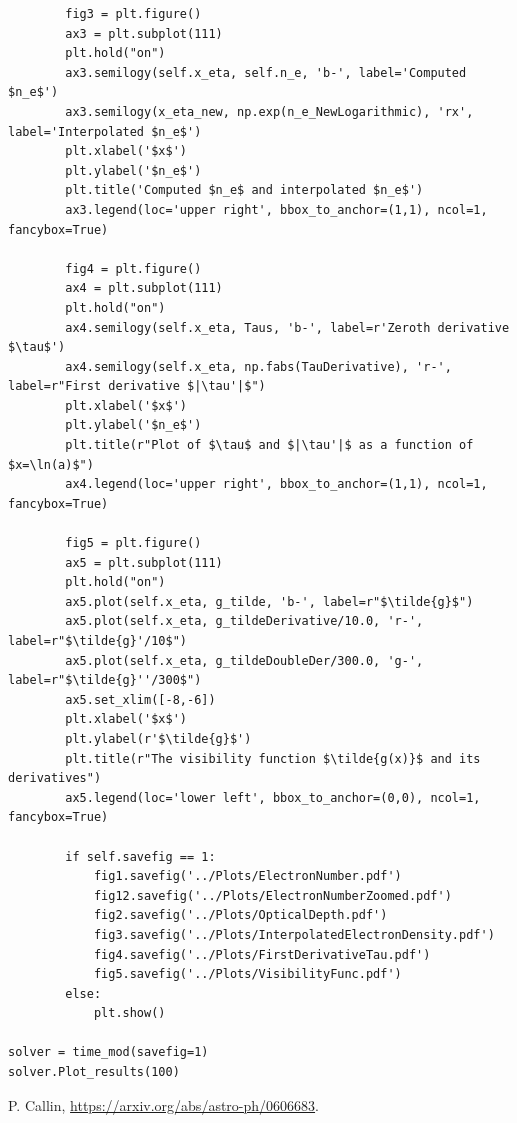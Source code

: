 \documentclass[12pt]{article}
\begin{document}
\begin{lstlisting}
		fig3 = plt.figure()
		ax3 = plt.subplot(111)
		plt.hold("on")
		ax3.semilogy(self.x_eta, self.n_e, 'b-', label='Computed $n_e$')
		ax3.semilogy(x_eta_new, np.exp(n_e_NewLogarithmic), 'rx', label='Interpolated $n_e$')
		plt.xlabel('$x$')
		plt.ylabel('$n_e$')		
		plt.title('Computed $n_e$ and interpolated $n_e$')		
		ax3.legend(loc='upper right', bbox_to_anchor=(1,1), ncol=1, fancybox=True)

		fig4 = plt.figure()
		ax4 = plt.subplot(111)
		plt.hold("on")
		ax4.semilogy(self.x_eta, Taus, 'b-', label=r'Zeroth derivative $\tau$')
		ax4.semilogy(self.x_eta, np.fabs(TauDerivative), 'r-', label=r"First derivative $|\tau'|$")
		plt.xlabel('$x$')
		plt.ylabel('$n_e$')
		plt.title(r"Plot of $\tau$ and $|\tau'|$ as a function of $x=\ln(a)$")
		ax4.legend(loc='upper right', bbox_to_anchor=(1,1), ncol=1, fancybox=True)
		
		fig5 = plt.figure()
		ax5 = plt.subplot(111)
		plt.hold("on")
		ax5.plot(self.x_eta, g_tilde, 'b-', label=r"$\tilde{g}$")
		ax5.plot(self.x_eta, g_tildeDerivative/10.0, 'r-', label=r"$\tilde{g}'/10$")
		ax5.plot(self.x_eta, g_tildeDoubleDer/300.0, 'g-', label=r"$\tilde{g}''/300$")
		ax5.set_xlim([-8,-6])
		plt.xlabel('$x$')
		plt.ylabel(r'$\tilde{g}$')
		plt.title(r"The visibility function $\tilde{g(x)}$ and its derivatives")
		ax5.legend(loc='lower left', bbox_to_anchor=(0,0), ncol=1, fancybox=True)
		
		if self.savefig == 1:
			fig1.savefig('../Plots/ElectronNumber.pdf')
			fig12.savefig('../Plots/ElectronNumberZoomed.pdf')
			fig2.savefig('../Plots/OpticalDepth.pdf')
			fig3.savefig('../Plots/InterpolatedElectronDensity.pdf')
			fig4.savefig('../Plots/FirstDerivativeTau.pdf')
			fig5.savefig('../Plots/VisibilityFunc.pdf')
		else:
			plt.show()

solver = time_mod(savefig=1)
solver.Plot_results(100)
\end{lstlisting}

\begin{thebibliography}{1}
     P. Callin, \url{https://arxiv.org/abs/astro-ph/0606683}.
\end{thebibliography}
\end{document}
